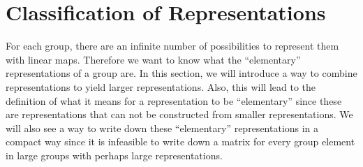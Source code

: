 \section{Classification of Representations}

For each group, there are an infinite number of possibilities to represent them with linear maps.
Therefore we want to know what the ``elementary'' representations of a group are.
In this section, we will introduce a way to combine representations to yield larger representations.
Also, this will lead to the definition of what it means for a representation to be ``elementary'' since these are representations that can not be constructed from smaller representations.
We will also see a way to write down these ``elementary'' representations in a compact way since it is infeasible to write down a matrix for every group element in large groups with perhaps large representations.




